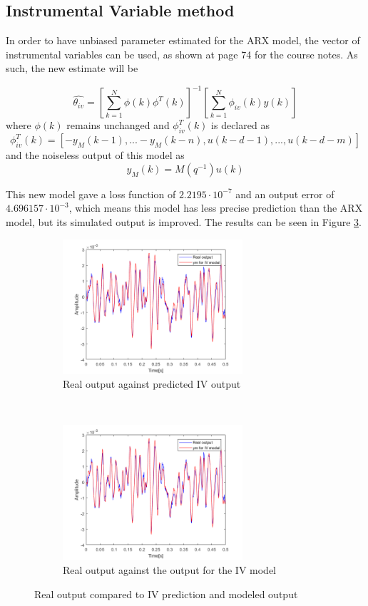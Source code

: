 \documentclass[a4paper,11pt]{article}
\begin{document}
\subsection*{Instrumental Variable method}
In order to have unbiased parameter estimated for the ARX model, the vector of instrumental variables can be used, as shown at page 74 for the course notes. As such, the new estimate will be

\begin{equation}
\hat{\theta_{iv}}=\left[ \sum\limits_{k=1}^N \phi(k)\phi^T(k)\right]^{-1}\left[ \sum\limits_{k=1}^N \phi_{iv}(k)y(k)\right]
\end{equation}
where $\phi(k)$ remains unchanged and $\phi_{iv}^T(k)$ is declared as
\begin{equation}
\phi_{iv}^T(k)=[-y_M(k-1),...-y_M(k-n),u(k-d-1),...,u(k-d-m)]
\end{equation}
and the noiseless output of this model as
\begin{equation}
y_M(k)=M(q^{-1})u(k)
\end{equation}

This new model gave a loss function of $2.2195\cdot10^{-7}$ and an output error of $4.696157\cdot10^{-3}$, which means this model has less precise prediction than the ARX model, but its simulated output is improved. The results can be seen in Figure \ref{fig:IV_outputs}.


\begin{figure}[H]
\centering
\begin{subfigure}[t]{0.4\textwidth}
\centering
\includegraphics[height = 5cm]{images/yhat_IV}
\caption{Real output against predicted IV output}
\label{fig:yhat_IV}
\end{subfigure}
~
\begin{subfigure}[t]{0.4\textwidth}
\centering
\includegraphics[height = 5cm]{images/ym_IV}
\caption{Real output against the output for the IV model}
\label{fig:ym_IV}
\end{subfigure}
\caption{Real output compared to IV prediction and modeled output}
\label{fig:IV_outputs}
\end{figure}
\end{document}
